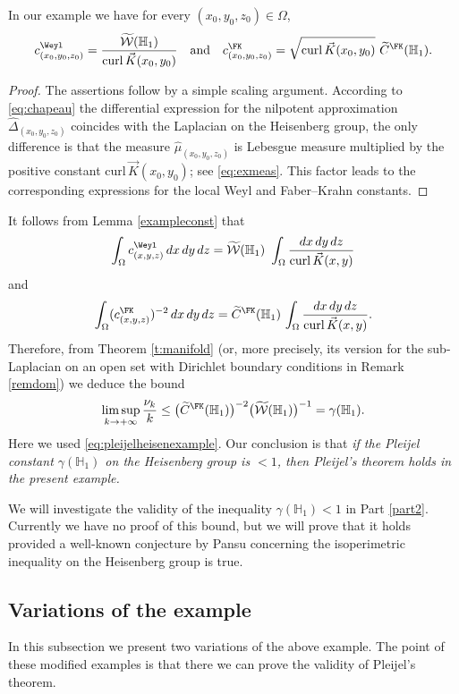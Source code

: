 \begin{lemma}\label{exampleconst}
In our example we have for every $(x_0,y_0,z_0)\in\Omega$,
\[
c^\Weyl_{(x_0,y_0,z_0)} = \frac{\widetilde{\mathcal W}(\mathbb H_1)}{\mathrm{curl}\,\vec{K}(x_0,y_0)}
\quad\text{and}\quad
c_{(x_0,y_0,z_0)}^\FK = \sqrt{\mathrm{curl}\,\vec{K}(x_0,y_0)} \ \widetilde C^\FK(\mathbb H_1).
\]
\end{lemma}

\begin{proof}
The assertions follow by a simple scaling argument. According to \eqref{eq:chapeau} the differential expression for the nilpotent approximation $\widehat\Delta_{(x_0,y_0,z_0)}$ coincides with the Laplacian on the Heisenberg group, the only difference is that the measure $\widehat\mu_{(x_0,y_0,z_0)}$ is Lebesgue measure multiplied by the positive constant $\mathrm{curl}\,\vec{K}(x_0,y_0)$; see \eqref{eq:exmeas}. This factor leads to the corresponding expressions for the local Weyl and Faber--Krahn constants.
\end{proof}

It follows from Lemma \ref{exampleconst} that
\[
\int_\Omega c^\Weyl_{(x,y,z)} \,dx\,dy\,dz = \widetilde{\mathcal W}(\mathbb H_1) \ \int_\Omega \frac{dx\,dy\,dz}{\text{curl}\,\vec{K}(x,y)}
\]
and
\[
\int_\Omega (c_{(x,y,z)}^\FK)^{-2} \,dx\,dy\,dz = \widetilde C^\FK(\mathbb H_1) \,\int_\Omega \frac{dx\,dy\,dz}{\text{curl}\,\vec{K}(x,y)}.
\]
Therefore, from Theorem \ref{t:manifold} (or, more precisely, its version for the sub-Laplacian on an open set with Dirichlet boundary conditions in Remark \ref{remdom}) we deduce the bound
\[
\limsup_{k\to+\infty} \frac{\nu_k}{k} \leq \bigl(\widetilde C^\FK(\mathbb H_1)\bigr)^{-2} \bigl(\widetilde{\mathcal W}(\mathbb H_1)\bigr)^{-1} = \gamma(\mathbb H_1).
\]
Here we used \eqref{eq:pleijelheisenexample}. Our conclusion is that \emph{if the Pleijel constant $\gamma(\mathbb H_1)$ on the Heisenberg group is $<1$, then Pleijel's theorem holds in the present example.}

We will investigate the validity of the inequality $\gamma(\mathbb H_1)<1$ in Part \ref{part2}. Currently we have no proof of this bound, but we will prove that it holds provided a well-known conjecture by Pansu concerning the isoperimetric inequality on the Heisenberg group is true.

\subsection{Variations of the example}
In this subsection we present two variations of the above example. The point of these modified examples is that there we can prove the validity of Pleijel's theorem.

